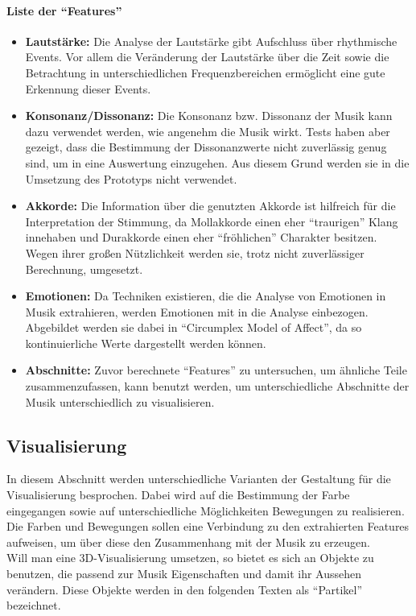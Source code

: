 \documentclass[11pt,a4paper]{article}
\begin{document}
\paragraph{Liste der ``Features''}
\begin{itemize}
\item \textbf{Lautstärke:}
Die Analyse der Lautstärke gibt Aufschluss über rhythmische Events. Vor allem die Veränderung der Lautstärke über die Zeit sowie die Betrachtung in unterschiedlichen Frequenzbereichen ermöglicht eine gute Erkennung dieser Events.
\item \textbf{Konsonanz/Dissonanz:}
Die Konsonanz bzw. Dissonanz der Musik kann dazu verwendet werden, wie angenehm die Musik wirkt. Tests haben aber gezeigt, dass die Bestimmung der Dissonanzwerte nicht zuverlässig genug sind, um in eine Auswertung einzugehen. Aus diesem Grund werden sie in die Umsetzung des Prototyps nicht verwendet.
\item \textbf{Akkorde:}
Die Information über die genutzten Akkorde ist hilfreich für die Interpretation der Stimmung, da Mollakkorde einen eher ``traurigen'' Klang innehaben und Durakkorde einen eher ``fröhlichen'' Charakter besitzen. Wegen ihrer großen Nützlichkeit werden sie, trotz nicht zuverlässiger Berechnung, umgesetzt.
\item \textbf{Emotionen:}
Da Techniken existieren, die die Analyse von Emotionen in Musik extrahieren, werden Emotionen mit in die Analyse einbezogen. Abgebildet werden sie dabei in ``Circumplex Model of Affect'', da so kontinuierliche Werte dargestellt werden können.
\item \textbf{Abschnitte:}
Zuvor berechnete ``Features'' zu untersuchen, um ähnliche Teile zusammenzufassen, kann benutzt werden, um unterschiedliche Abschnitte der Musik unterschiedlich zu visualisieren.
\end{itemize}

\subsection{Visualisierung}
In diesem Abschnitt werden unterschiedliche Varianten der Gestaltung für die Visualisierung besprochen. Dabei wird auf die Bestimmung der Farbe eingegangen sowie auf unterschiedliche Möglichkeiten Bewegungen zu realisieren. Die Farben und Bewegungen sollen eine Verbindung zu den extrahierten Features aufweisen, um über diese den Zusammenhang mit der Musik zu erzeugen.\\
Will man eine 3D-Visualisierung umsetzen, so bietet es sich an Objekte zu benutzen, die passend zur Musik Eigenschaften
und damit ihr Aussehen verändern. Diese Objekte werden in den folgenden Texten als ``Partikel'' bezeichnet.
\end{document}
